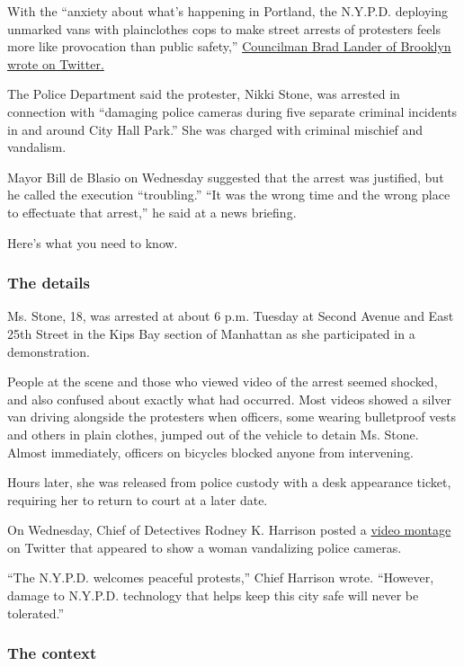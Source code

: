 With the ``anxiety about what's happening in Portland, the N.Y.P.D.
deploying unmarked vans with plainclothes cops to make street arrests of
protesters feels more like provocation than public safety,''
\href{https://twitter.com/bradlander/status/1288289187880476672}{Councilman
Brad Lander of Brooklyn wrote on Twitter.}

The Police Department said the protester, Nikki Stone, was arrested in
connection with ``damaging police cameras during five separate criminal
incidents in and around City Hall Park.'' She was charged with criminal
mischief and vandalism.

Mayor Bill de Blasio on Wednesday suggested that the arrest was
justified, but he called the execution ``troubling.'' ``It was the wrong
time and the wrong place to effectuate that arrest,'' he said at a news
briefing.

Here's what you need to know.

\hypertarget{the-details}{%
\subsubsection{The details}\label{the-details}}

Ms. Stone, 18, was arrested at about 6 p.m. Tuesday at Second Avenue and
East 25th Street in the Kips Bay section of Manhattan as she
participated in a demonstration.

People at the scene and those who viewed video of the arrest seemed
shocked, and also confused about exactly what had occurred. Most videos
showed a silver van driving alongside the protesters when officers, some
wearing bulletproof vests and others in plain clothes, jumped out of the
vehicle to detain Ms. Stone. Almost immediately, officers on bicycles
blocked anyone from intervening.

Hours later, she was released from police custody with a desk appearance
ticket, requiring her to return to court at a later date.

On Wednesday, Chief of Detectives Rodney K. Harrison posted a
\href{https://twitter.com/NYPDDetectives/status/1288493685571821568}{video
montage} on Twitter that appeared to show a woman vandalizing police
cameras.

``The N.Y.P.D. welcomes peaceful protests,'' Chief Harrison wrote.
``However, damage to N.Y.P.D. technology that helps keep this city safe
will never be tolerated.''

\hypertarget{the-context}{%
\subsubsection{The context}\label{the-context}}

